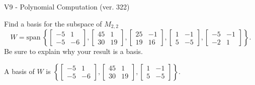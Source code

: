 \begin{exercise}
  \begin{exerciseTitle}V9 - Polynomial Computation (ver. 322)\end{exerciseTitle}
  \begin{exerciseStatement}
    Find a basis for the subspace of \(M_{2,2}\) 
\[W=\mathrm{span}\ \left\{\left[\begin{array}{cc}
-5 & 1 \\
-5 & -6
\end{array}\right] , \left[\begin{array}{cc}
45 & 1 \\
30 & 19
\end{array}\right] , \left[\begin{array}{cc}
25 & -1 \\
19 & 16
\end{array}\right] , \left[\begin{array}{cc}
1 & -1 \\
5 & -5
\end{array}\right] , \left[\begin{array}{cc}
-5 & -1 \\
-2 & 1
\end{array}\right]\right\}.\]
 Be sure to explain why your result is a basis.


  \end{exerciseStatement}
  \begin{exerciseAnswer}
   A basis of \(W\) is  \(\left\{\left[\begin{array}{cc}
-5 & 1 \\
-5 & -6
\end{array}\right] , \left[\begin{array}{cc}
45 & 1 \\
30 & 19
\end{array}\right] , \left[\begin{array}{cc}
1 & -1 \\
5 & -5
\end{array}\right]\right\}\).
  


  \end{exerciseAnswer}
\end{exercise}